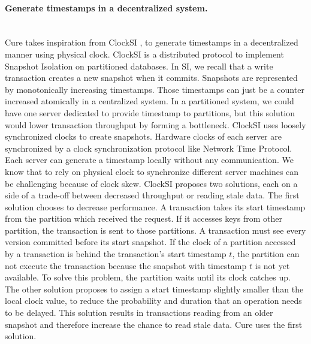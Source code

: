 \documentclass[11pt]{article}
\begin{document}
\paragraph{Generate timestamps in a decentralized system.}\mbox{}\\
Cure takes inspiration from ClockSI \cite{Du2013}, to generate timestamps in a
decentralized manner using physical clock. ClockSI is a distributed protocol
to implement Snapshot Isolation on partitioned databases. In SI, we recall
that a write transaction creates a new snapshot when it commits. Snapshots are
represented by monotonically increasing timestamps. Those timestamps can just
be a counter increased atomically in a centralized system. In a partitioned
system, we could have one server dedicated to provide timestamp to partitions,
but this solution would lower transaction throughput by forming a bottleneck.
ClockSI uses loosely synchronized clocks to create snapshots. Hardware clocks
of each server are synchronized by a clock synchronization protocol like
Network Time Protocol. Each server can generate a timestamp locally without
any communication. We know that to rely on physical clock to synchronize
different server machines can be challenging because of clock skew. ClockSI
proposes two solutions, each on a side of a trade-off between decreased
throughput or reading stale data. The first solution chooses to decrease
performance. A transaction takes its start timestamp from the partition which
received the request. If it accesses keys from other partition, the
transaction is sent to those partitions. A transaction must see every version
committed before its start snapshot. If the clock of a partition accessed by a
transaction is behind the transaction's start timestamp $t$, the partition can
not execute the transaction because the snapshot with timestamp $t$ is not yet
available. To solve this problem, the partition waits until its clock catches
up. The other solution proposes to assign a start timestamp slightly smaller
than the local clock value, to reduce the probability and duration that an
operation needs to be delayed. This solution results in transactions reading
from an older snapshot and therefore increase the chance to read stale data.
Cure uses the first solution.
\end{document}
